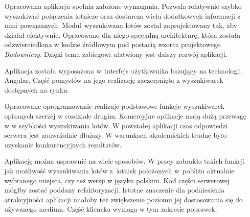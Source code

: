 \documentclass[12pt, twoside]{report}
\begin{document}
Opracowana aplikacja spełnia założone wymagania. Pozwala relatywnie szybko wyszukiwać połączenia lotnicze oraz dostarcza wielu dodatkowych informacji z nimi powiązanych. Moduł wyszukiwana lotów został zaprojektowany tak, aby działał efektywnie. Opracowano dla niego specjalną architekturę, która została odzwierciedlona w kodzie źródłowym pod postacią wzorca projektowego \textit{Budowniczy}. Dzięki temu zabiegowi ułatwiony jest dalszy rozwój aplikacji.
 
Aplikacja została wyposażona w~interfejs użytkownika bazujący na technologii Angular.  Część pomysłów na jego realizację zaczerpnięto z wyszukiwarek dostępnych na rynku.


Opracowane oprogramowanie realizuje podstawowe funkcje wyszukiwarek opisanych szerzej w rozdziale drugim. Komercyjne aplikacje mają dużą przewagę w w szybkości wyszukiwania lotów. W powstałej aplikacji czas odpowiedzi serwera jest zauważalnie dłuższy. W warunkach akademickich trudne było uzyskanie konkurencyjnych rezultatów.

Aplikację można usprawnić na wiele sposobów. W pracy zabrakło takich funkcji jak możliwość wyszukiwania lotów z~lotnisk położonych w~pobliżu aktualnie wybranego miejsca, czy też  wersji w języku polskim. Kod części serwerowej mógłby zostać poddany refaktoryzacji. Istotne znaczenie dla podniesienia atrakcyjności aplikacji miałoby też zwiększenie poziomu jej dostosowania się do używanego medium. Część kliencka wymaga w tym zakresie poprawek. 
\end{document}
